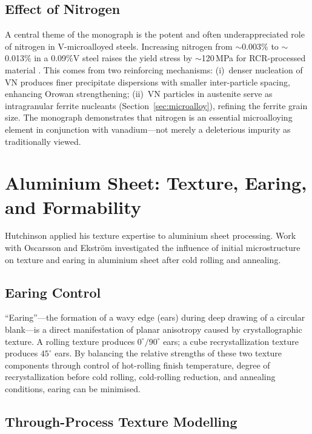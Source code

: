 \documentclass[11pt,a4paper]{article}
\begin{document}
\subsection{Effect of Nitrogen}

A central theme of the monograph is the potent and often underappreciated
role of nitrogen in V-microalloyed steels.  Increasing nitrogen from
$\sim$0.003\% to $\sim$0.013\% in a 0.09\%V steel raises the yield
stress by $\sim$120\,MPa for RCR-processed material \cite{Zajac1991}.
This comes from two reinforcing mechanisms: (i)~denser nucleation of VN
produces finer precipitate dispersions with smaller inter-particle
spacing, enhancing Orowan strengthening; (ii)~VN particles in austenite
serve as intragranular ferrite nucleants (Section~\ref{sec:microalloy}),
refining the ferrite grain size.  The monograph demonstrates that
nitrogen is an essential microalloying element in conjunction with
vanadium---not merely a deleterious impurity as traditionally viewed.

\section{Aluminium Sheet: Texture, Earing, and Formability}
\label{sec:aluminium}

Hutchinson applied his texture expertise to aluminium sheet processing.
Work with Oscarsson and Ekstr\"om \cite{Oscarsson1991} investigated the
influence of initial microstructure on texture and earing in aluminium
sheet after cold rolling and annealing.

\subsection{Earing Control}

``Earing''---the formation of a wavy edge (ears) during deep drawing of
a circular blank---is a direct manifestation of planar anisotropy caused
by crystallographic texture.  A rolling texture produces $0^\circ/90^\circ$
ears; a cube recrystallization texture produces $45^\circ$ ears.  By
balancing the relative strengths of these two texture components through
control of hot-rolling finish temperature, degree of recrystallization
before cold rolling, cold-rolling reduction, and annealing conditions,
earing can be minimised.

\subsection{Through-Process Texture Modelling}
\end{document}
